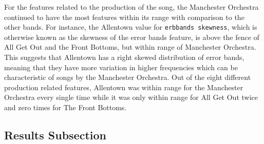 \documentclass{article}\usepackage[]{graphicx}\usepackage[]{xcolor}
\begin{document}
\begin{multicols}{2}
    For the features related to the production of the song, the Manchester Orchestra continued to have the most features within its range with comparison to the other bands. For instance, the Allentown value for \texttt{erbbands skewness}, which is otherwise known as the skewness of the error bands feature, is above the fence of All Get Out and the Front Bottoms, but within range of Manchester Orchestra. This suggests that Allentown has a right skewed distribution of error bands, meaning that they have more variation in higher frequencies which can be characteristic of songs by the Manchester Orchestra. Out of the eight different production related features, Allentown was within range for the Manchester Orchestra every single time while it was only within range for All Get Out twice and zero times for The Front Bottoms.
  

\subsection{Results Subsection}




\end{multicols}
\end{document}

